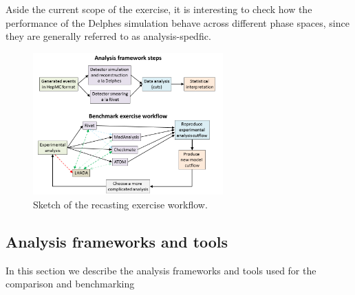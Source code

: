\documentclass[11pt]{cernrep}
\begin{document}
Aside the current scope of the exercise, it is interesting to check how the performance of the Delphes simulation behave across different phase spaces, since they are generally referred to as analysis-spedfic.


\begin{figure}
\begin{center}
\includegraphics[width=0.65\textwidth]{figures/lhada_benchmarking_excersise.png}
 \caption{Sketch of the recasting exercise workflow.
}
\label{fig:exercise}
\end{center}
\end{figure}


\subsection{Analysis frameworks and tools}
In this section we describe the analysis frameworks and tools used for the comparison and benchmarking
\end{document}

